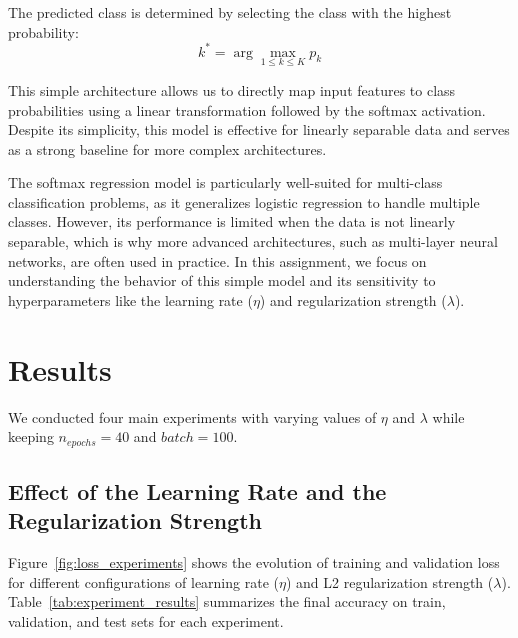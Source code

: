 \documentclass{article}
\begin{document}
The predicted class is determined by selecting the class with the highest probability:
\[
k^* = \arg\max_{1 \leq k \leq K} p_k
\]

This simple architecture allows us to directly map input features to class probabilities using a linear transformation followed by the softmax activation. Despite its simplicity, this model is effective for linearly separable data and serves as a strong baseline for more complex architectures.

The softmax regression model is particularly well-suited for multi-class classification problems, as it generalizes logistic regression to handle multiple classes. However, its performance is limited when the data is not linearly separable, which is why more advanced architectures, such as multi-layer neural networks, are often used in practice. In this assignment, we focus on understanding the behavior of this simple model and its sensitivity to hyperparameters like the learning rate ($\eta$) and regularization strength ($\lambda$).

\section{Results}
We conducted four main experiments with varying values of $\eta$ and $\lambda$ while keeping $n_{epochs}=40$ and $batch=100$.

\subsection{Effect of the Learning Rate and the Regularization Strength}

Figure~\ref{fig:loss_experiments} shows the evolution of training and validation loss for different configurations of learning rate ($\eta$) and L2 regularization strength ($\lambda$). Table~\ref{tab:experiment_results} summarizes the final accuracy on train, validation, and test sets for each experiment.
\end{document}
